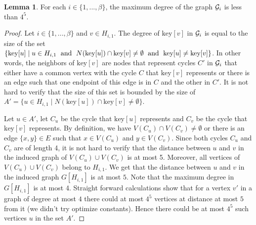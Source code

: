 \documentclass{article}
\theoremstyle{definition}
\newtheorem{lemma}{Lemma}[section]
\def\shiri#1{\textcolor{red}{[Shiri: #1]}}
\begin{document}
\begin{lemma}  For each $i \in \{1, ..., \beta\}$, the maximum degree of the graph ${\cal G}_{i}$ is less than $4^5$. \label{lem:degreeSuperGraph}\end{lemma}
\begin{proof} Let $i \in \{1, ..., \beta\}$ and $v \in H_{i,1}$. The degree of $\text{key}[v]$ in ${\cal G}_{i}$ is equal to the size of the set $\{\text{key}[u] \mid u \in H_{i,1} \text{\; and \;} N(\text{key}[u]) \cap \text{key}[v] \ne \emptyset  \text{\; and \;} \text{key}[u] \ne \text{key}[v]\}$.
In other words, the neighbors of $\text{key}[v]$ are nodes that represent cycles $C'$ in ${\cal G}_{i}$ that either have a common vertex with the cycle $C$ that $\text{key}[v]$ represents or there is an edge such that one endpoint of this edge is in $C$ and the other in $C'$.
It is not hard to verify that the size of this set is bounded by the size of $A' = \{u \in H_{i,1} \mid N(\text{key}[u]) \cap \text{key}[v] \ne \emptyset\}$.

Let $u \in A'$, let $C_u$ be the cycle that $\text{key}[u]$ represents and $C_v$ be the cycle that $\text{key}[v]$ represents.
By definition, we have $V(C_u) \cap V(C_v) \neq \emptyset$ or there is an edge $\{x,y\} \in E$ such that $x \in V(C_u)$ and $y \in V(C_v)$.
Since both cycles  $C_u$ and $C_v$ are of length 4, it is not hard to verify that the distance between $u$ and $v$ in the induced graph of
$V(C_u) \cup V(C_v)$ is at most 5.
Moreover, all vertices of $V(C_u) \cup V(C_v)$ belong to $H_{i,1}$.
We get that the distance between $u$ and $v$ in the induced graph $G[H_{i,1}]$ is at most $5$.
Note that the maximum degree in $G[H_{i,1}]$ is at most 4.
Straight forward calculations show that for a vertex $v'$ in a graph of degree at most $4$ there could at most $4^5$ vertices at distance at most $5$ from it (we didn't try optimize constants). Hence there could be at most $4^5$ such vertices $u$ in the set $A'$.
%
\end{proof}
\end{document}
